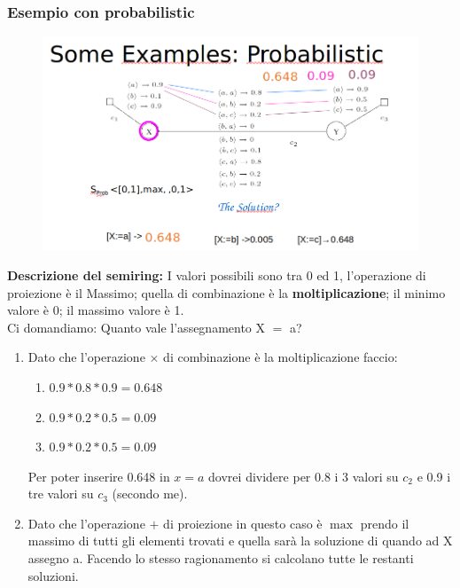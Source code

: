 \subsubsection{Esempio con probabilistic}
\begin{figure}[htp]
    \centering
    \includegraphics[width=14cm, keepaspectratio]{img/Cap4/probabilistic2.png}
\end{figure}
\noindent \textbf{Descrizione del semiring:} I valori possibili sono tra 0 ed 1,
l'operazione di proiezione è il Massimo; quella di combinazione è la
\textbf{moltiplicazione}; il minimo valore è 0; il massimo valore è 1. \\Ci
domandiamo: Quanto vale l'assegnamento X $=$ a?
\begin{enumerate}
    \item Dato che l'operazione $\times$ di combinazione è la moltiplicazione faccio:
          \begin{enumerate}
              \item $0.9*0.8*0.9 = 0.648$
              \item $0.9*0.2*0.5 = 0.09$
              \item $0.9*0.2*0.5 = 0.09$
          \end{enumerate}
          Per poter inserire 0.648 in $x = a$ dovrei dividere per 0.8 i 3 valori
          su $c_2$ e 0.9 i tre valori su $c_3$ (secondo me).
    \item Dato che l'operazione $+$ di proiezione in questo caso è $\max$ prendo il
          massimo di tutti gli elementi trovati e quella sarà la soluzione di
          quando ad X assegno a. Facendo lo stesso ragionamento si calcolano
          tutte le restanti soluzioni.
\end{enumerate}


